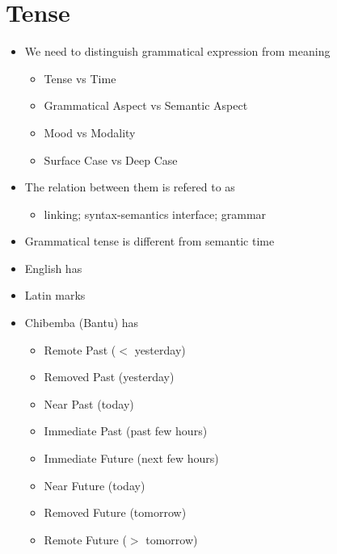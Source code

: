 \documentclass[headrule,footrule]{foils}
\begin{document}
\section{Tense}

\begin{center}
  \LARGE {}
\end{center}
\begin{itemize}
\item  We need to distinguish grammatical expression from 
  meaning
  \begin{itemize}
  \item  Tense vs Time
  \item  Grammatical Aspect vs Semantic Aspect
  \item  Mood vs Modality
  \item  Surface Case vs Deep Case
  \end{itemize}
\item  The relation between them is refered to as
  \begin{itemize}
  \item  linking; syntax-semantics interface; grammar
  \end{itemize}
\end{itemize} 
 

\begin{itemize}
\item  Grammatical tense is different from semantic time
\item  English has 
\item  Latin marks 
\item  Chibemba (Bantu) has 
  {\small
  \begin{multicols}{2}
  \begin{itemize}
  \item  Remote Past ($<$ yesterday)
  \item  Removed Past (yesterday)
  \item  Near Past (today)
  \item  Immediate Past (past few hours)
  \item Immediate Future (next few hours)
  \item Near Future (today)
  \item Removed Future (tomorrow)
  \item Remote Future ($>$ tomorrow)
  \end{itemize}
\end{multicols}}
\end{itemize}
\end{document}
